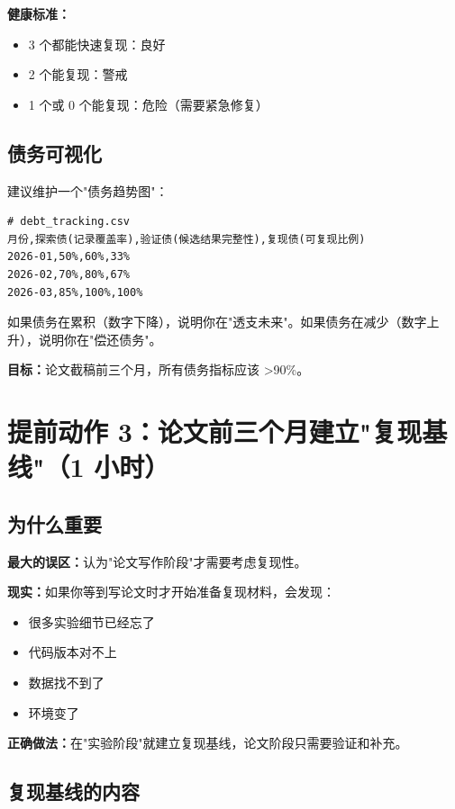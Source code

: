 \textbf{健康标准：}
\begin{itemize}
  \item 3 个都能快速复现：良好
  \item 2 个能复现：警戒
  \item 1 个或 0 个能复现：危险（需要紧急修复）
\end{itemize}

\subsection{债务可视化}

建议维护一个"债务趋势图"：

\begin{verbatim}
# debt_tracking.csv
月份,探索债(记录覆盖率),验证债(候选结果完整性),复现债(可复现比例)
2026-01,50%,60%,33%
2026-02,70%,80%,67%
2026-03,85%,100%,100%
\end{verbatim}

如果债务在累积（数字下降），说明你在"透支未来"。如果债务在减少（数字上升），说明你在"偿还债务"。

\textbf{目标：}论文截稿前三个月，所有债务指标应该 >90\%。

\section{提前动作 3：论文前三个月建立"复现基线"（1 小时）}

\subsection{为什么重要}

\textbf{最大的误区：}认为"论文写作阶段"才需要考虑复现性。

\textbf{现实：}如果你等到写论文时才开始准备复现材料，会发现：
\begin{itemize}
  \item 很多实验细节已经忘了
  \item 代码版本对不上
  \item 数据找不到了
  \item 环境变了
\end{itemize}

\textbf{正确做法：}在"实验阶段"就建立复现基线，论文阶段只需要验证和补充。

\subsection{复现基线的内容}

